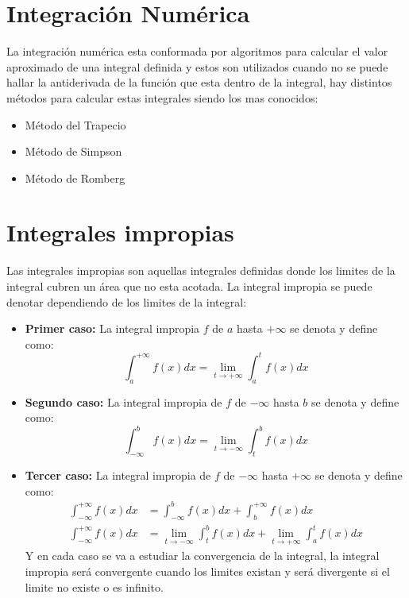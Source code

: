 \documentclass[../main]{subfiles}
\begin{document}
\section{Integración Numérica}
La integración numérica esta conformada por algoritmos para calcular el valor aproximado de una integral definida y estos son utilizados cuando no se puede hallar la antiderivada de la función que esta dentro de la integral, hay distintos métodos para calcular estas integrales siendo los mas conocidos:
\begin{itemize}
    \item Método del Trapecio
    \item Método de Simpson
    \item Método de Romberg
\end{itemize}

\section{Integrales impropias}
Las integrales impropias son aquellas integrales definidas donde los limites de la integral cubren un área que no esta acotada. La integral impropia se puede denotar dependiendo de los limites de la integral:
\begin{itemize}
    \item \textbf{Primer caso:} La integral impropia $f$ de $a$ hasta $+ \infty$ se denota y define como:
        \begin{equation}
            \int_a^{+\infty} f(x)dx=\lim_{t \rightarrow + \infty} \int_a^t f(x)dx
        \end{equation}
    \item \textbf{Segundo caso:} La integral impropia de $f$ de $- \infty$ hasta $b$ se denota y define como:
        \begin{equation}
            \int_{- \infty}^b f(x)dx=\lim_{t \rightarrow - \infty} \int_t^b f(x)dx
        \end{equation}
    \item \textbf{Tercer caso:} La integral impropia de $f$ de $- \infty$ hasta $+ \infty$ se denota y define como:
        \begin{align*}
            \int_{- \infty}^{+ \infty} f(x)dx&= \int_{- \infty}^b f(x)dx+\int_b^{+\infty} f(x)dx \\
            \int_{- \infty}^{+ \infty} f(x)dx&= \lim_{t \rightarrow - \infty} \int_t^b f(x)dx+\lim_{t\rightarrow + \infty} \int_a^t f(x)dx
        \end{align*}
    Y en cada caso se va a estudiar la convergencia de la integral, la integral impropia será convergente cuando los limites existan y será divergente si el limite no existe o es infinito.
\end{itemize}
\end{document}
